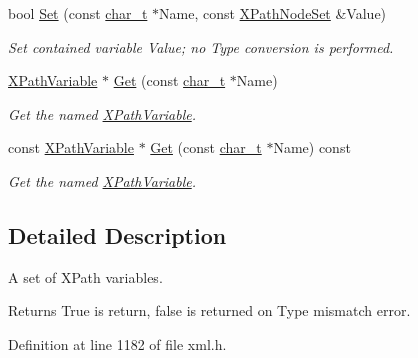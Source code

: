 \begin{DoxyCompactItemize}
bool \hyperlink{classphys_1_1xml_1_1XPathVariableSet_a61fe3aa60d13a4a224d301456a230a7c}{Set} (const \hyperlink{namespacephys_1_1xml_afc87705cd1c2917d87b879715a2d8f6e}{char\_\-t} $\ast$Name, const \hyperlink{classphys_1_1xml_1_1XPathNodeSet}{XPathNodeSet} \&Value)
\begin{DoxyCompactList}\small\item\em Set contained variable Value; no Type conversion is performed. \item\end{DoxyCompactList}\item 
\hyperlink{classphys_1_1xml_1_1XPathVariable}{XPathVariable} $\ast$ \hyperlink{classphys_1_1xml_1_1XPathVariableSet_aaf4a46b271298bbb86a6379567e590ee}{Get} (const \hyperlink{namespacephys_1_1xml_afc87705cd1c2917d87b879715a2d8f6e}{char\_\-t} $\ast$Name)
\begin{DoxyCompactList}\small\item\em Get the named \hyperlink{classphys_1_1xml_1_1XPathVariable}{XPathVariable}. \item\end{DoxyCompactList}\item 
const \hyperlink{classphys_1_1xml_1_1XPathVariable}{XPathVariable} $\ast$ \hyperlink{classphys_1_1xml_1_1XPathVariableSet_a64274e4889036c318c701614d2cfa5ab}{Get} (const \hyperlink{namespacephys_1_1xml_afc87705cd1c2917d87b879715a2d8f6e}{char\_\-t} $\ast$Name) const 
\begin{DoxyCompactList}\small\item\em Get the named \hyperlink{classphys_1_1xml_1_1XPathVariable}{XPathVariable}. \item\end{DoxyCompactList}\end{DoxyCompactItemize}


\subsection{Detailed Description}
A set of XPath variables. \begin{DoxyReturn}{Returns}
True is return, false is returned on Type mismatch error. 
\end{DoxyReturn}


Definition at line 1182 of file xml.h.



